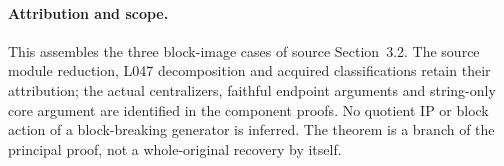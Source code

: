 \documentclass[11pt,a4paper]{article}
\begin{document}
\paragraph{Attribution and scope.}
This assembles the three block-image cases of source Section~3.2.
The source module reduction, L047 decomposition and acquired
classifications retain their attribution; the actual centralizers,
faithful endpoint arguments and string-only core argument are
identified in the component proofs. No quotient IP or block action
of a block-breaking generator is inferred. The theorem is a branch
of the principal proof, not a whole-original recovery by itself.
\end{document}
